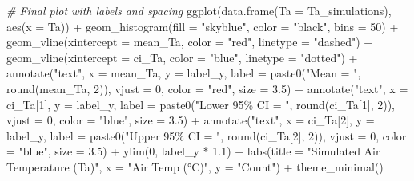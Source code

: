 \documentclass[
]{article}
\newenvironment{Shaded}{\begin{snugshade}}{\end{snugshade}}
\newcommand{\AttributeTok}[1]{\textcolor[rgb]{0.77,0.63,0.00}{#1}}
\newcommand{\CommentTok}[1]{\textcolor[rgb]{0.56,0.35,0.01}{\textit{#1}}}
\newcommand{\DecValTok}[1]{\textcolor[rgb]{0.00,0.00,0.81}{#1}}
\newcommand{\FloatTok}[1]{\textcolor[rgb]{0.00,0.00,0.81}{#1}}
\newcommand{\FunctionTok}[1]{\textcolor[rgb]{0.00,0.00,0.00}{#1}}
\newcommand{\NormalTok}[1]{#1}
\newcommand{\SpecialCharTok}[1]{\textcolor[rgb]{0.00,0.00,0.00}{#1}}
\newcommand{\StringTok}[1]{\textcolor[rgb]{0.31,0.60,0.02}{#1}}
\begin{document}
\begin{Shaded}
\begin{Highlighting}[]
\CommentTok{\# Final plot with labels and spacing}
\FunctionTok{ggplot}\NormalTok{(}\FunctionTok{data.frame}\NormalTok{(}\AttributeTok{Ta =}\NormalTok{ Ta\_simulations), }\FunctionTok{aes}\NormalTok{(}\AttributeTok{x =}\NormalTok{ Ta)) }\SpecialCharTok{+}
  \FunctionTok{geom\_histogram}\NormalTok{(}\AttributeTok{fill =} \StringTok{"skyblue"}\NormalTok{, }\AttributeTok{color =} \StringTok{"black"}\NormalTok{, }\AttributeTok{bins =} \DecValTok{50}\NormalTok{) }\SpecialCharTok{+}
  \FunctionTok{geom\_vline}\NormalTok{(}\AttributeTok{xintercept =}\NormalTok{ mean\_Ta, }\AttributeTok{color =} \StringTok{"red"}\NormalTok{, }\AttributeTok{linetype =} \StringTok{"dashed"}\NormalTok{) }\SpecialCharTok{+}
  \FunctionTok{geom\_vline}\NormalTok{(}\AttributeTok{xintercept =}\NormalTok{ ci\_Ta, }\AttributeTok{color =} \StringTok{"blue"}\NormalTok{, }\AttributeTok{linetype =} \StringTok{"dotted"}\NormalTok{) }\SpecialCharTok{+}
  \FunctionTok{annotate}\NormalTok{(}\StringTok{"text"}\NormalTok{, }\AttributeTok{x =}\NormalTok{ mean\_Ta, }\AttributeTok{y =}\NormalTok{ label\_y, }\AttributeTok{label =} \FunctionTok{paste0}\NormalTok{(}\StringTok{"Mean = "}\NormalTok{, }\FunctionTok{round}\NormalTok{(mean\_Ta, }\DecValTok{2}\NormalTok{)),}
           \AttributeTok{vjust =} \DecValTok{0}\NormalTok{, }\AttributeTok{color =} \StringTok{"red"}\NormalTok{, }\AttributeTok{size =} \FloatTok{3.5}\NormalTok{) }\SpecialCharTok{+}
  \FunctionTok{annotate}\NormalTok{(}\StringTok{"text"}\NormalTok{, }\AttributeTok{x =}\NormalTok{ ci\_Ta[}\DecValTok{1}\NormalTok{], }\AttributeTok{y =}\NormalTok{ label\_y, }\AttributeTok{label =} \FunctionTok{paste0}\NormalTok{(}\StringTok{"Lower 95\% CI = "}\NormalTok{, }\FunctionTok{round}\NormalTok{(ci\_Ta[}\DecValTok{1}\NormalTok{], }\DecValTok{2}\NormalTok{)),}
           \AttributeTok{vjust =} \DecValTok{0}\NormalTok{, }\AttributeTok{color =} \StringTok{"blue"}\NormalTok{, }\AttributeTok{size =} \FloatTok{3.5}\NormalTok{) }\SpecialCharTok{+}
  \FunctionTok{annotate}\NormalTok{(}\StringTok{"text"}\NormalTok{, }\AttributeTok{x =}\NormalTok{ ci\_Ta[}\DecValTok{2}\NormalTok{], }\AttributeTok{y =}\NormalTok{ label\_y, }\AttributeTok{label =} \FunctionTok{paste0}\NormalTok{(}\StringTok{"Upper 95\% CI = "}\NormalTok{, }\FunctionTok{round}\NormalTok{(ci\_Ta[}\DecValTok{2}\NormalTok{], }\DecValTok{2}\NormalTok{)),}
           \AttributeTok{vjust =} \DecValTok{0}\NormalTok{, }\AttributeTok{color =} \StringTok{"blue"}\NormalTok{, }\AttributeTok{size =} \FloatTok{3.5}\NormalTok{) }\SpecialCharTok{+}
  \FunctionTok{ylim}\NormalTok{(}\DecValTok{0}\NormalTok{, label\_y }\SpecialCharTok{*} \FloatTok{1.1}\NormalTok{) }\SpecialCharTok{+}
  \FunctionTok{labs}\NormalTok{(}\AttributeTok{title =} \StringTok{"Simulated Air Temperature (Ta)"}\NormalTok{,}
       \AttributeTok{x =} \StringTok{"Air Temp (°C)"}\NormalTok{, }\AttributeTok{y =} \StringTok{"Count"}\NormalTok{) }\SpecialCharTok{+}
  \FunctionTok{theme\_minimal}\NormalTok{()}
\end{Highlighting}
\end{Shaded}
\end{document}
